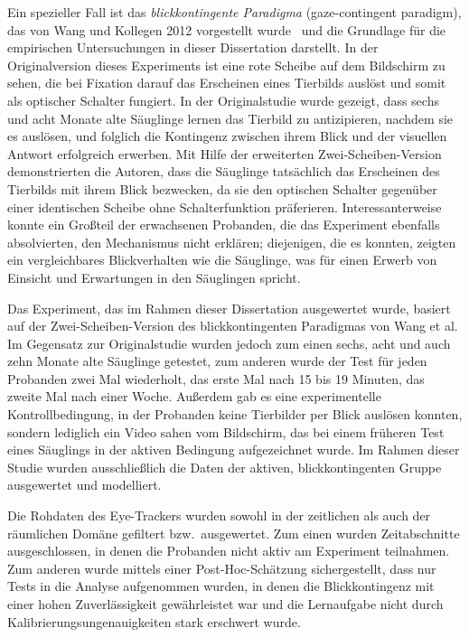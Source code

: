 \documentclass[a4paper]{scrreprt}
\begin{document}
Ein spezieller Fall ist das \textit{blickkontingente Paradigma} (gaze-contingent paradigm), das von Wang und Kollegen 2012 vorgestellt wurde~\cite{wang12} und die Grundlage f\"ur die empirischen Untersuchungen in dieser Dissertation darstellt. In der Originalversion dieses Experiments ist eine rote Scheibe auf dem Bildschirm zu sehen, die bei Fixation darauf das Erscheinen eines Tierbilds ausl\"ost und somit als optischer Schalter fungiert.
In der Originalstudie wurde gezeigt, dass sechs und acht Monate alte S\"auglinge lernen das Tierbild zu antizipieren, nachdem sie es ausl\"osen, und folglich die Kontingenz zwischen ihrem Blick und der visuellen Antwort erfolgreich erwerben. Mit Hilfe der erweiterten Zwei-Scheiben-Version demonstrierten die Autoren, dass die S\"auglinge tats\"achlich das Erscheinen des Tierbilds mit ihrem Blick bezwecken, da sie den optischen Schalter gegen\"uber einer identischen Scheibe ohne Schalterfunktion pr\"aferieren. Interessanterweise konnte ein Gro\ss teil der erwachsenen Probanden, die das Experiment ebenfalls absolvierten, den Mechanismus nicht erkl\"aren; diejenigen, die es konnten, zeigten ein vergleichbares Blickverhalten wie die S\"auglinge, was f\"ur einen Erwerb von Einsicht und Erwartungen in den S\"auglingen spricht.

\quad

Das Experiment, das im Rahmen dieser Dissertation ausgewertet wurde, basiert auf der Zwei-Scheiben-Version des blickkontingenten Paradigmas von Wang et al. Im Gegensatz zur Originalstudie wurden jedoch zum einen sechs, acht und auch zehn Monate alte S\"auglinge getestet, zum anderen wurde der Test f\"ur jeden Probanden zwei Mal wiederholt, das erste Mal nach 15 bis 19 Minuten, das zweite Mal nach einer Woche. Au\ss erdem gab es eine experimentelle Kontrollbedingung, in der Probanden keine Tierbilder per Blick ausl\"osen konnten, sondern lediglich ein Video sahen vom Bildschirm, das bei einem fr\"uheren Test eines S\"auglings in der aktiven Bedingung aufgezeichnet wurde. Im Rahmen dieser Studie wurden ausschlie\ss lich die Daten der aktiven, blickkontingenten Gruppe ausgewertet und modelliert.

Die Rohdaten des Eye-Trackers wurden sowohl in der zeitlichen als auch der r\"aumlichen Dom\"ane gefiltert bzw.~ausgewertet. Zum einen wurden Zeitabschnitte ausgeschlossen, in denen die Probanden nicht aktiv am Experiment teilnahmen. Zum anderen wurde mittels einer Post-Hoc-Sch\"atzung sichergestellt, dass nur Tests in die Analyse aufgenommen wurden, in denen die Blickkontingenz mit einer hohen Zuverl\"assigkeit gew\"ahrleistet war und die Lernaufgabe nicht durch Kalibrierungsungenauigkeiten stark erschwert wurde.
\end{document}
